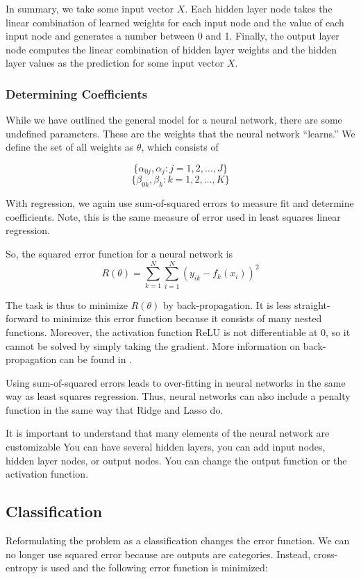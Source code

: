 \documentclass[12pt]{article}
\begin{document}
In summary, we take some input vector $X$. Each hidden layer node takes the linear combination of learned weights for each input node and the value of each input node and generates a number between 0 and 1. Finally, the output layer node computes the linear combination of hidden layer weights and the hidden layer values as the prediction for some input vector $X$.

\subsubsection{Determining Coefficients}
While we have outlined the general model for a neural network, there are some undefined parameters. These are the weights that the neural network ``learns.'' We define the set of all weights as $\theta$, which consists of 

$$\{\alpha_{0j}, \alpha_j: j = 1, 2, \dots, J\}$$
$$\{\beta_{0k}, \beta_k:  k= 1, 2, \dots, K\}$$

With regression, we again use sum-of-squared errors to measure fit and determine coefficients. Note, this is the same measure of error used in least squares linear regression.

So, the squared error function for a neural network is 
$$R(\theta) = \sum_{k=1}^{N} \sum_{i=1}^{N} (y_{ik} - f_k(x_i))^2$$ 

The task is thus to minimize $R(\theta)$ by back-propagation. It is less straight-forward to minimize this error function because it consists of many nested functions. Moreover, the activation function ReLU is not differentiable at 0, so it cannot be solved by simply taking the gradient. More information on back-propagation can be found in \cite[354]{springer}. 

Using sum-of-squared errors leads to over-fitting in neural networks in the same way as least squares regression. Thus, neural networks can also include a penalty function in the same way that Ridge and Lasso do. 

It is important to understand that many elements of the neural network are customizable You can have several hidden layers, you can add input nodes, hidden layer nodes, or output nodes. You can change the output function or the activation function. 

\subsection{Classification}
Reformulating the problem as a classification changes the error function. We can no longer use squared error because are outputs are categories. Instead, cross-entropy is used and the following error function is minimized: 
\end{document}
